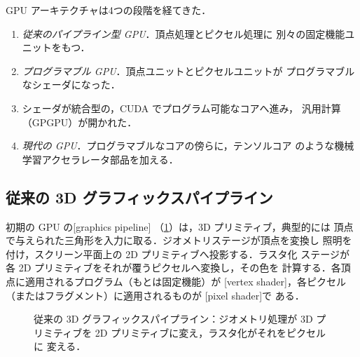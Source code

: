 \documentclass[../main.tex]{subfiles}
\begin{document}
GPU アーキテクチャは4つの段階を経てきた．
\begin{enumerate}
  \item \emph{従来のパイプライン型 GPU}．頂点処理とピクセル処理に
    別々の固定機能ユニットをもつ．
  \item \emph{プログラマブル GPU}．頂点ユニットとピクセルユニットが
    プログラマブルなシェーダになった．
  \item シェーダが統合型の，CUDA でプログラム可能なコアへ進み，
    汎用計算（GPGPU）が開かれた．
  \item \emph{現代の GPU}．プログラマブルなコアの傍らに，テンソルコア
    のような機械学習アクセラレータ部品を加える．
\end{enumerate}

\subsection{従来の 3D グラフィックスパイプライン}

初期の GPU の[graphics pipeline]
（\cref{fig:l01-graphics-pipeline}）は，3D プリミティブ，典型的には
頂点で与えられた三角形を入力に取る．ジオメトリステージが頂点を変換し
照明を付け，スクリーン平面上の 2D プリミティブへ投影する．ラスタ化
ステージが各 2D プリミティブをそれが覆うピクセルへ変換し，その色を
計算する．各頂点に適用されるプログラム（もとは固定機能）が
[vertex shader]，各ピクセル
（またはフラグメント）に適用されるものが
[pixel shader]で
ある．

\begin{figure}[htbp]
  \centering
  
  \caption{従来の 3D グラフィックスパイプライン：ジオメトリ処理が 3D
    プリミティブを 2D プリミティブに変え，ラスタ化がそれをピクセルに
    変える．}
  \label{fig:l01-graphics-pipeline}
\end{figure}
\end{document}
